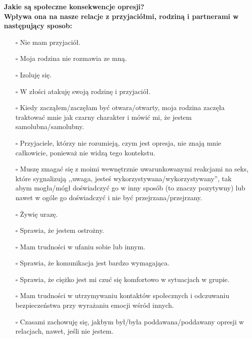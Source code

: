 \noindent\textcolor{ProcessBlue}{\textbf{\Large{Jakie są społeczne konsekwencje opresji?}}}\\
\textbf{\large{Wpływa ona na nasze relacje z przyjaciółmi, rodziną i partnerami w następujący sposob:}}
\begin{multicols}{2}
\begin{itemize}
\item[$\square$]{Nie mam przyjaciół.}
\item[$\square$]{Moja rodzina nie rozmawia ze mną.}
\item[$\square$]{Izoluję się.}
\item[$\square$]{W złości atakuję swoją rodzinę i przyjaciół.}
\item[$\square$]{Kiedy zacząłem/zaczęłam być otwara/otwarty, moja rodzina zaczęła traktować mnie jak czarny charakter i mówić mi, że jestem samolubna/samolubny.}
\item[$\square$]{Przyjaciele, którzy nie rozumieją, czym jest opresja, nie znają mnie całkowicie, ponieważ nie widzą tego kontekstu.}
\item[$\square$]{Muszę zmagać się z moimi wewnętrznie uwarunkowanymi reakcjami na seks, które sygnalizują ,,uwaga, jesteś wykorzystywana/wykorzystywany'', tak abym mogła/mógł doświadczyć go w inny sposób (to znaczy pozytywny) lub nawet w ogóle go doświadczyć i nie być przejrzana/przejrzany.}
\item[$\square$]{Żywię urazę.}
\item[$\square$]{Sprawia, że jestem ostrożny.}
\item[$\square$]{Mam trudności w ufaniu sobie lub innym.}
\item[$\square$]{Sprawia, że komunikacja jest bardzo wymagająca.}
\item[$\square$]{Sprawia, że ciężko jest mi czuć się komfortowo w sytuacjach w grupie.}
\item[$\square$]{Mam trudności w utrzymywaniu kontaktów społecznych i odczuwaniu bezpieczeństwa przy wyrażaniu emocji wśród innych.}
\item[$\square$]{Czasami zachowuję się, jakbym był/była poddawana/poddawany opresji w relacjach, nawet, jeśli nie jestem.}
\end{itemize}
\end{multicols}


